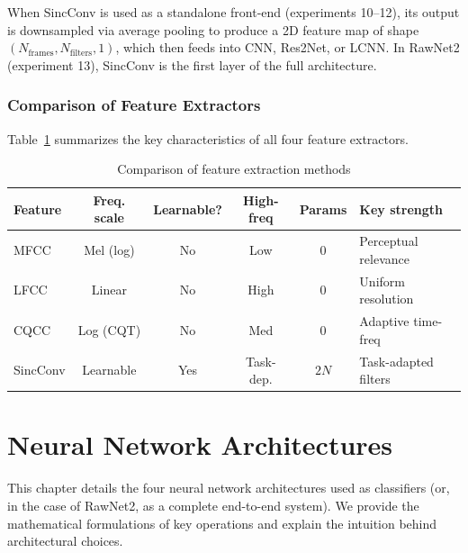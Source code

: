 \documentclass[12pt]{report}
\begin{document}
\begin{notebox}
    When SincConv is used as a standalone front-end (experiments 10--12), its output is
    downsampled via average pooling to produce a 2D feature map of shape
    $(N_\text{frames}, N_\text{filters}, 1)$, which then feeds into CNN, Res2Net, or LCNN.
    In RawNet2 (experiment 13), SincConv is the first layer of the full architecture.
\end{notebox}

\subsection{Comparison of Feature Extractors}

Table~\ref{tab:feat-comparison} summarizes the key characteristics of all four feature extractors.

\begin{table}[h!]
\centering
\caption{Comparison of feature extraction methods}
\label{tab:feat-comparison}
\begin{tabularx}{\textwidth}{lccccX}
\toprule
\textbf{Feature} & \textbf{Freq. scale} & \textbf{Learnable?} & \textbf{High-freq} & \textbf{Params} & \textbf{Key strength} \\
\midrule
MFCC     & Mel (log)   & No  & Low   & 0 & Perceptual relevance \\
LFCC     & Linear      & No  & High  & 0 & Uniform resolution \\
CQCC     & Log (CQT)   & No  & Med   & 0 & Adaptive time-freq \\
SincConv & Learnable   & Yes & Task-dep. & $2N$ & Task-adapted filters \\
\bottomrule
\end{tabularx}
\end{table}


\chapter{Neural Network Architectures}

This chapter details the four neural network architectures used as classifiers (or, in the
case of RawNet2, as a complete end-to-end system). We provide the mathematical formulations
of key operations and explain the intuition behind architectural choices.


\end{document}
